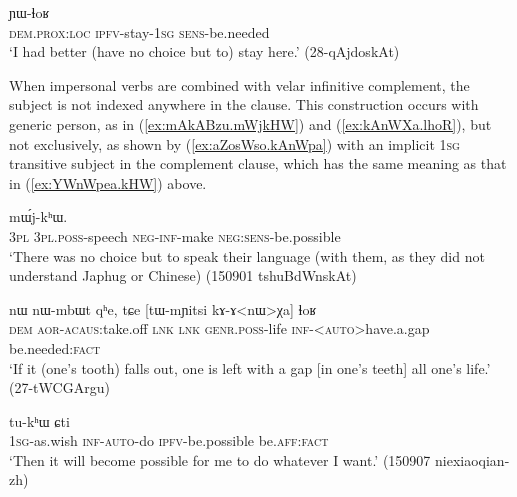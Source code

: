 \begin{exe} 
\ex \label{ex:kurAZia.YWlhoR}
 ɲɯ-ɬoʁ \\
\textsc{dem}.\textsc{prox}:\textsc{loc} \textsc{ipfv}-stay-\textsc{1sg} \textsc{sens}-be.needed \\
\glt `I had better (have no choice but to) stay here.' (28-qAjdoskAt)
\end{exe} 

When impersonal verbs are combined with velar infinitive complement, the subject is not indexed anywhere in the clause. This construction occurs with generic person, as in (\ref{ex:mAkABzu.mWjkHW}) and (\ref{ex:kAnWXa.lhoR}), but not exclusively, as shown by (\ref{ex:aZosWso.kAnWpa}) with an implicit \textsc{1sg} transitive subject in the complement clause, which has the same meaning as that in (\ref{ex:YWnWpea.kHW}) above.

\begin{exe} 
\ex \label{ex:mAkABzu.mWjkHW}
 mɯ́j-kʰɯ. \\
\textsc{3pl} \textsc{3pl}.\textsc{poss}-speech \textsc{neg}-\textsc{inf}-make \textsc{neg}:\textsc{sens}-be.possible \\
\glt `There was no choice but to speak their language (with them, as they did not understand Japhug or Chinese) (150901 tshuBdWnskAt)
\end{exe} 

\begin{exe} 
\ex \label{ex:kAnWXa.lhoR}
\gll  nɯ nɯ-mbɯt qʰe, tɕe [tɯ-mɲitsi kɤ-ɤ<nɯ>χa] ɬoʁ \\
\textsc{dem} \textsc{aor}-\textsc{acaus}:take.off \textsc{lnk} \textsc{lnk} \textsc{genr}.\textsc{poss}-life \textsc{inf}-<\textsc{auto}>have.a.gap be.needed:\textsc{fact} \\
\glt `If it (one's tooth) falls out, one is left with a gap [in one's teeth] all one's life.' (27-tWCGArgu)
\end{exe} 

\begin{exe} 
\ex \label{ex:aZosWso.kAnWpa}
 tu-kʰɯ ɕti \\
\textsc{1sg}-as.wish \textsc{inf}-\textsc{auto}-do \textsc{ipfv}-be.possible be.\textsc{aff}:\textsc{fact} \\
\glt `Then it will become possible for me to do whatever I want.' (150907 niexiaoqian-zh)
\end{exe} 


